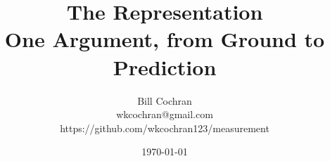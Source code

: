 \documentclass[12pt,oneside]{book}
\begin{document}
\title{The Representation\\
\large One Argument, from Ground to Prediction}

\author{Bill Cochran\\wkcochran@gmail.com\\https://github.com/wkcochran123/measurement}
\date{\today}

\maketitle

\tableofcontents














\end{document}
